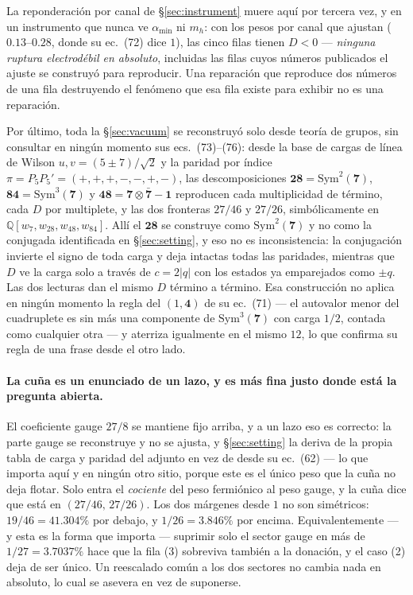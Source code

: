 \documentclass[11pt,a4paper]{article}
\newcommand{\rep}[1]{\mathbf{#1}}
\newcommand{\amin}{\alpha_{\min}}
\begin{document}
La reponderación por canal de \S\ref{sec:instrument} muere aquí por tercera vez, y en un instrumento
que nunca ve $\amin$ ni $m_h$: con los pesos por canal que ajustan ($0.13$--$0.28$, donde su ec.~(72)
dice $1$), las cinco filas tienen $D<0$ --- \emph{ninguna ruptura electrodébil en absoluto},
incluidas las filas cuyos números publicados el ajuste se construyó para reproducir. Una reparación
que reproduce dos números de una fila destruyendo el fenómeno que esa fila existe para exhibir no es
una reparación.

Por último, toda la \S\ref{sec:vacuum} se reconstruyó solo desde teoría de grupos, sin consultar en
ningún momento sus ecs.~(73)--(76): desde la base de cargas de línea de Wilson $u,v=(5\pm7)/\sqrt2$ y
la paridad por índice $\pi=P_5P_5'=(+,+,+,-,-,+,-)$, las descomposiciones
$\rep{28}=\mathrm{Sym}^2(\rep7)$, $\rep{84}=\mathrm{Sym}^3(\rep7)$ y
$\rep{48}=\rep7\otimes\rep{\bar7}-\rep1$ reproducen cada multiplicidad de término, cada $D$ por
multiplete, y las dos fronteras $27/46$ y $27/26$, simbólicamente en
$\mathbb{Q}[w_7,w_{28},w_{48},w_{84}]$. Allí el $\rep{28}$ se construye como
$\mathrm{Sym}^2(\rep7)$ y no como la conjugada identificada en \S\ref{sec:setting}, y eso no es
inconsistencia: la conjugación invierte el signo de toda carga y deja intactas todas las paridades,
mientras que $D$ ve la carga solo a través de $c=2|q|$ con los estados ya emparejados como $\pm q$.
Las dos lecturas dan el mismo $D$ término a término. Esa construcción no aplica en ningún momento la
regla del $(1,\rep4)$ de su ec.~(71) --- el autovalor menor del cuadruplete es sin más una componente
de $\mathrm{Sym}^3(\rep7)$ con carga $1/2$, contada como cualquier otra --- y aterriza igualmente en
el mismo $12$, lo que confirma su regla de una frase desde el otro lado.

\paragraph{La cuña es un enunciado de un lazo, y es más fina justo donde está la pregunta abierta.}
El coeficiente gauge $27/8$ se mantiene fijo arriba, y a un lazo eso es correcto: la parte gauge se
reconstruye y no se ajusta, y \S\ref{sec:setting} la deriva de la propia tabla de carga y paridad del
adjunto en vez de desde su ec.~(62) --- lo que importa aquí y en ningún otro sitio, porque este es el
único peso que la cuña no deja flotar. Solo entra el \emph{cociente} del peso fermiónico al peso
gauge, y la cuña dice que está en $(27/46,\,27/26)$. Los dos márgenes desde $1$ no son simétricos:
$19/46=41.304\%$ por debajo, y $1/26=3.846\%$ por encima. Equivalentemente --- y esta es la forma que
importa --- suprimir solo el sector gauge en más de $1/27=3.7037\%$ hace que la fila (3) sobreviva
también a la donación, y el caso (2) deja de ser único. Un reescalado común a los dos sectores no
cambia nada en absoluto, lo cual se asevera en vez de suponerse.
\end{document}

